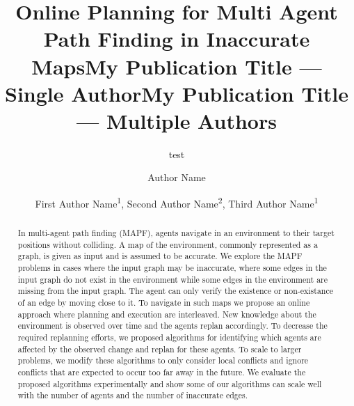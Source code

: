 \documentclass[letterpaper]{article} %
\title{Online Planning for Multi Agent Path Finding in Inaccurate Maps}
\author{
    test
}
\title{My Publication Title --- Single Author}
\author {
    Author Name
}
\title{My Publication Title --- Multiple Authors}
\author {
    First Author Name\textsuperscript{\rm 1},
    Second Author Name\textsuperscript{\rm 2},
    Third Author Name\textsuperscript{\rm 1}
}
\def\
UrlFont{\rm}  %
\newcommand{\nir}[1]{\textbf{[\color{blue}NIR:#1]}}
\newcommand{\commentout}[1]{}
\theoremstyle{definition}
\begin{document}
\maketitle

\begin{abstract}
In multi-agent path finding (MAPF), agents navigate in an environment to their target positions without colliding. A map of the environment, commonly represented as a graph, is given as input and is assumed to be accurate. 
We explore the MAPF problems in cases where the input graph may be inaccurate, where some edges in the input graph do not exist in the environment while some edges in the environment are missing from the input graph. 
The agent can only verify the existence or non-existance of an edge by moving close to it. 
To navigate in such maps we propose an online approach where planning and execution are interleaved. 
New knowledge about the environment is observed over time and the agents replan accordingly. 
To decrease the required replanning efforts, we proposed algorithms for identifying which agents are affected by the observed change and replan for these agents. 
To scale to larger problems, we modify these algorithms to only consider local conflicts and ignore conflicts that are expected to occur too far away in the future. 
We evaluate the proposed algorithms experimentally and show some of our algorithms can scale well with the number of agents and the number of inaccurate edges.


\commentout{

}
\end{abstract}
\end{document}
